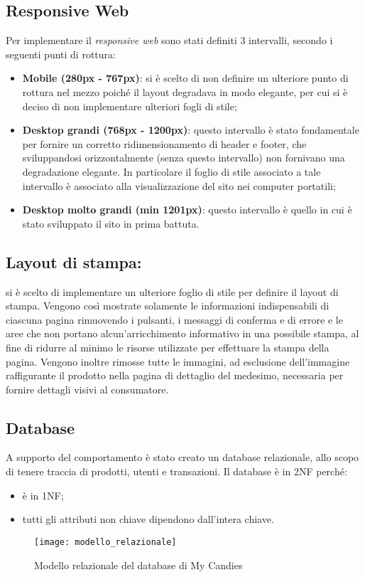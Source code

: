 \subsection{Responsive Web}
Per implementare il \textit{responsive web} sono stati definiti 3 intervalli, secondo i seguenti punti di rottura:
\begin{itemize}
    \item \textbf{Mobile (280px - 767px)}: si è scelto di non definire un ulteriore punto di rottura nel mezzo poiché  il layout degradava in modo elegante, per cui si è deciso di non implementare ulteriori fogli di stile;
    \item \textbf{Desktop grandi (768px - 1200px)}: questo intervallo è stato fondamentale per fornire un corretto ridimensionamento di header e footer, che sviluppandosi orizzontalmente (senza questo intervallo) non fornivano una degradazione elegante. In particolare il foglio di stile associato a tale intervallo è associato alla visualizzazione del sito nei computer portatili;
    \item \textbf{Desktop molto grandi (min 1201px)}: questo intervallo è quello in cui è stato sviluppato il sito in prima battuta. 
\end{itemize}

\subsection{Layout di stampa:} si è scelto di implementare un ulteriore foglio di stile per definire il layout di stampa. Vengono così mostrate solamente le informazioni indispensabili di ciascuna pagina rimuovendo i pulsanti, i messaggi di conferma e di errore e le aree che non portano alcun'arricchimento informativo in una possibile stampa, al fine di ridurre al minimo le risorse utilizzate per effettuare la stampa della pagina. Vengono inoltre rimosse tutte le immagini, ad esclusione dell'immagine raffigurante il prodotto nella pagina di dettaglio del medesimo, necessaria per fornire dettagli visivi al consumatore.

\subsection{Database}
A supporto del comportamento è stato creato un database relazionale, allo scopo di tenere traccia di prodotti, utenti e transazioni. Il database è in 2NF perché:
\begin{itemize}
    \item è in 1NF;
    \item tutti gli attributi non chiave dipendono dall'intera chiave.
\end{itemize}
\begin{figure}[H]
\centering
\texttt{[image: modello\_relazionale]}
\caption{Modello relazionale del database di My Candies} 
\end{figure}

